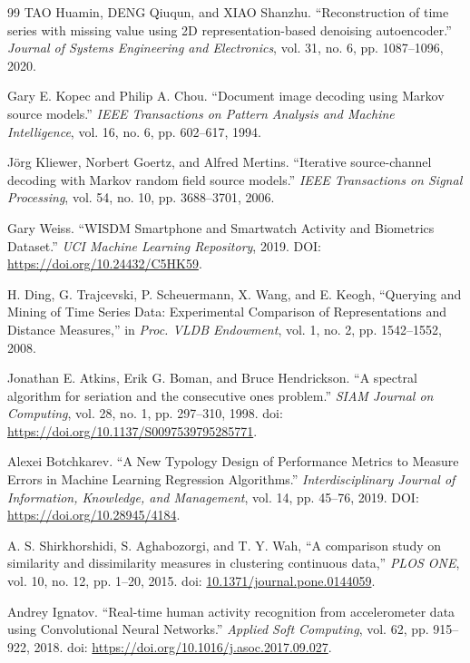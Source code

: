 \documentclass[10pt,a4paper,parskip=half-]{scrartcl}
\begin{document}
\begin{thebibliography}{99}
TAO Huamin, DENG Qiuqun, and XIAO Shanzhu. “Reconstruction of time series with missing value using 2D representation-based denoising autoencoder.” \textit{Journal of Systems Engineering and Electronics}, vol. 31, no. 6, pp. 1087–1096, 2020.

Gary E. Kopec and Philip A. Chou. “Document image decoding using Markov source models.” \textit{IEEE Transactions on Pattern Analysis and Machine Intelligence}, vol. 16, no. 6, pp. 602–617, 1994.

Jörg Kliewer, Norbert Goertz, and Alfred Mertins. “Iterative source-channel decoding with Markov random field source models.” \textit{IEEE Transactions on Signal Processing}, vol. 54, no. 10, pp. 3688–3701, 2006.


Gary Weiss. “WISDM Smartphone and Smartwatch Activity and Biometrics Dataset.” \textit{UCI Machine Learning Repository}, 2019. DOI: \url{https://doi.org/10.24432/C5HK59}.

H. Ding, G. Trajcevski, P. Scheuermann, X. Wang, and E. Keogh,
``Querying and Mining of Time Series Data: Experimental Comparison of Representations and Distance Measures,''
in \emph{Proc. VLDB Endowment}, vol. 1, no. 2, pp. 1542--1552, 2008.

Jonathan E. Atkins, Erik G. Boman, and Bruce Hendrickson.
``A spectral algorithm for seriation and the consecutive ones problem.''
\textit{SIAM Journal on Computing}, vol. 28, no. 1, pp. 297--310, 1998. doi: \url{https://doi.org/10.1137/S0097539795285771}.


Alexei Botchkarev. ``A New Typology Design of Performance Metrics to Measure Errors in Machine Learning Regression Algorithms.'' \textit{Interdisciplinary Journal of Information, Knowledge, and Management}, vol. 14, pp. 45--76, 2019. DOI: \url{https://doi.org/10.28945/4184}.

A. S. Shirkhorshidi, S. Aghabozorgi, and T. Y. Wah, ``A comparison study on similarity and dissimilarity measures in clustering continuous data,'' \textit{PLOS ONE}, vol. 10, no. 12, pp. 1--20, 2015. doi: \url{10.1371/journal.pone.0144059}.

Andrey Ignatov. ``Real-time human activity recognition from accelerometer data using Convolutional Neural Networks.'' \textit{Applied Soft Computing}, vol. 62, pp. 915--922, 2018. doi: \url{https://doi.org/10.1016/j.asoc.2017.09.027}.


\end{thebibliography}
\end{document}
